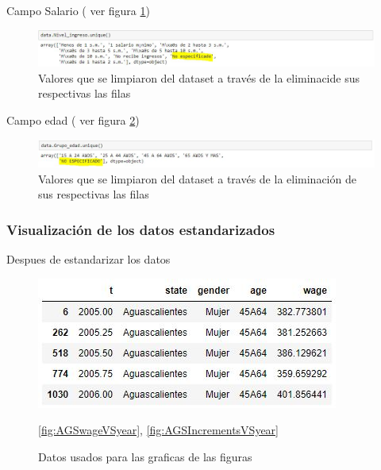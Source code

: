 Campo Salario ( ver figura \ref{fig:wageUnique_Standarization})
\begin{figure}[h!]
	\centering
	\includegraphics[width=1\linewidth]{Figure/wageUnique_Standarization.JPG}
	\caption{Valores que se limpiaron del dataset a trav\'es de la eliminaci\on de sus respectivas las filas}
	\label{fig:wageUnique_Standarization}
\end{figure}

Campo edad ( ver figura \ref{fig:ageUnique_Standarization})
\begin{figure}[h!]
	\centering
	\includegraphics[width=1\linewidth]{Figure/ageUnique_Standarization.JPG}
	\caption{Valores que se limpiaron del dataset a trav\'es de la eliminaci\'on de sus respectivas las filas}
	\label{fig:ageUnique_Standarization}
\end{figure}

\subsubsection{Visualizaci\'on de los datos estandarizados}
Despues de estandarizar los datos 
\begin{figure}[h!]
	\centering
	\includegraphics[width=0.8\linewidth]{Figure/AGSdatos_visualizacion.JPG}
	\caption{Datos usados para las graficas de las figuras} \ref{fig:AGSwageVSyear}, \ref{fig:AGSIncrementsVSyear} 
	\label{fig:AGSdatos}
\end{figure}

